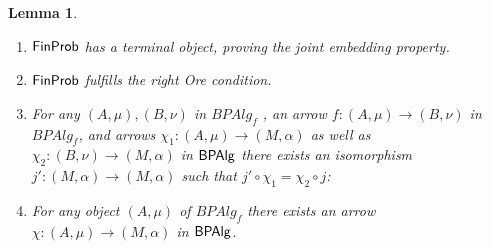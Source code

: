 \documentclass[a4paper]{amsproc}
\theoremstyle{plain}
\newtheorem{lemma}[theorem]{Lemma}
\theoremstyle{definition}
\theoremstyle{remark}
\numberwithin{equation}{section}
\newcommand{\FinProb}{\textup{\textsf{FinProb}}}
\newcommand{\BPAlg}{\textup{\textsf{BPAlg}}}
\begin{document}
\begin{lemma}\begin{enumerate}
\item $\FinProb$ has a terminal object, proving the joint embedding property.
\item $\FinProb$ fulfills the right Ore condition.
\item For any $(A,\mu),(B,\nu)$ in $BPAlg_f$ , an arrow $f:(A,\mu)\rightarrow (B,\nu)$ in \\
 $BPAlg_f$, and arrows $\chi_1:(A,\mu)\rightarrow (M, \alpha)$ as well as $\chi_2:(B,\nu)\rightarrow (M, \alpha)$ in $\BPAlg$ there exists an isomorphism $j':(M, \alpha) \rightarrow (M, \alpha)$ such that $j'\circ \chi_1=\chi_2\circ j$:
 \begin{center}
 \end{center}
\item For any object $(A,\mu)$ of $BPAlg_f$ there exists an arrow $\chi:(A,\mu)\rightarrow (M, \alpha)$ in $\BPAlg$.
\end{enumerate}
\end{lemma}
\end{document}
